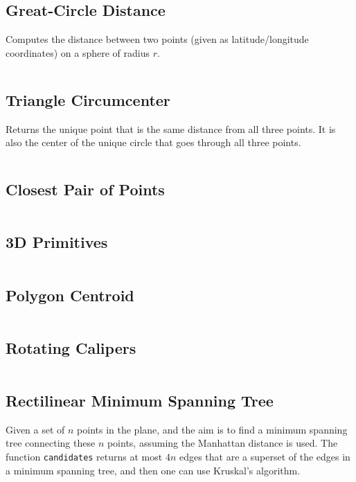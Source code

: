 \documentclass[8pt,a4paper,landscape,oneside]{amsart}
\newcommand{\code}[1]{\inputminted[fontsize=\normalsize,baselinestretch=1]{cpp}{_code/#1}}
\newif\ifverbose
\begin{document}
\begin{multicols*}{3}
    \subsection{Great-Circle Distance}
        Computes the distance between two points (given as latitude/longitude
        coordinates) on a sphere of radius $r$.
        \code{geometry/gc_distance.cpp}

    \subsection{Triangle Circumcenter}
        Returns the unique point that is the same distance from all three
        points. It is also the center of the unique circle that goes through
        all three points.
        \code{geometry/circumcenter.cpp}

    \subsection{Closest Pair of Points}
        \ifverbose
        A sweep line algorithm for computing the distance between the closest
        pair of points.
        \fi
        \code{geometry/closest_pair.cpp}

    \subsection{3D Primitives}
        \ifverbose
        Three-dimensional geometry primitives.
        \fi
        \code{geometry/primitives3d.cpp}

    \subsection{Polygon Centroid}
        \code{geometry/polygon_centroid.cpp}

    \subsection{Rotating Calipers}
        \code{geometry/rotating_calipers.cpp}

    \subsection{Rectilinear Minimum Spanning Tree}
        Given a set of $n$ points in the plane, and the aim is to find a
        minimum spanning tree connecting these $n$ points, assuming the
        Manhattan distance is used. The function \texttt{candidates} returns at
        most $4n$ edges that are a superset of the edges in a minimum spanning
        tree, and then one can use Kruskal's algorithm.
        \code{geometry/rmst.cpp}


\end{multicols*}
\end{document}
